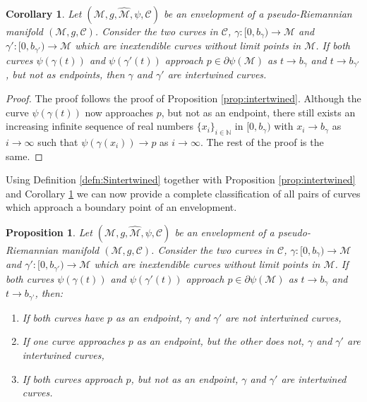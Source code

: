 \documentclass[pdflatex,sn-mathphys-num]{sn-jnl}
\newtheorem{prop}[theorem]{Proposition}
\newtheorem{cor}[theorem]{Corollary}
\theoremstyle{definition}
\begin{document}
\begin{cor} \label{cor:0}
    Let $(\mathcal{M},g,\hat{\mathcal{M}},\psi,\mathcal{C})$ be an envelopment of a pseudo-Riemannian manifold  $(\mathcal{M},g,\mathcal{C})$. Consider the two curves in $\mathcal{C}$, $\gamma:[0,b_{\gamma}) \rightarrow \mathcal{M}$ and $\gamma':[0,b_{\gamma'}) \rightarrow \mathcal{M}$ which are inextendible curves without limit points in $\mathcal{M}$. If both curves $\psi(\gamma(t))$ and $\psi(\gamma'(t))$ approach $p \in  \partial\psi(\mathcal{M})$ as $t \rightarrow b_{\gamma}$ and $t \rightarrow b_{\gamma'}$, but not as endpoints, then $\gamma$ and $\gamma'$ are intertwined curves.
\end{cor}
\begin{proof}
    The proof follows the proof of Proposition \ref{prop:intertwined}. Although the curve $\psi(\gamma(t))$ now approaches $p$, but not as an endpoint, there still exists an increasing infinite sequence of real numbers $\{x_i\}_{i \in \mathbb{N}}$ in $[0,b_{\gamma})$ with $x_i \rightarrow b_{\gamma}$ as $i \rightarrow \infty$ such that $\psi(\gamma(x_i)) \rightarrow p$ as $i \rightarrow \infty$. The rest of the proof is the same.
\end{proof}

Using Definition \ref{defn:Sintertwined} together with Proposition \ref{prop:intertwined} and Corollary \ref{cor:0} we can now provide a complete classification of all pairs of curves which approach a boundary point of an envelopment.

\begin{prop}\label{prop:intertwined_classification}
    Let $(\mathcal{M},g,\hat{\mathcal{M}},\psi,\mathcal{C})$ be an envelopment of a pseudo-Riemannian manifold  $(\mathcal{M},g,\mathcal{C})$. Consider the two curves in $\mathcal{C}$, $\gamma:[0,b_{\gamma}) \rightarrow \mathcal{M}$ and $\gamma':[0,b_{\gamma'}) \rightarrow \mathcal{M}$ which are inextendible curves without limit points in $\mathcal{M}$. If both curves $\psi(\gamma(t))$ and $\psi(\gamma'(t))$ approach $p \in  \partial\psi(\mathcal{M})$ as $t \rightarrow b_{\gamma}$ and $t \rightarrow b_{\gamma’}$, then:

\begin{enumerate}
        \item If both curves have $p$ as an endpoint, $\gamma$ and $\gamma'$ are not intertwined curves,
        \item If one curve approaches $p$ as an endpoint, but the other does not, $\gamma$ and $\gamma'$ are intertwined curves,
        \item If both curves approach $p$, but not as an endpoint, $\gamma$ and $\gamma'$ are intertwined curves.
    \end{enumerate}
\end{prop}
\end{document}
